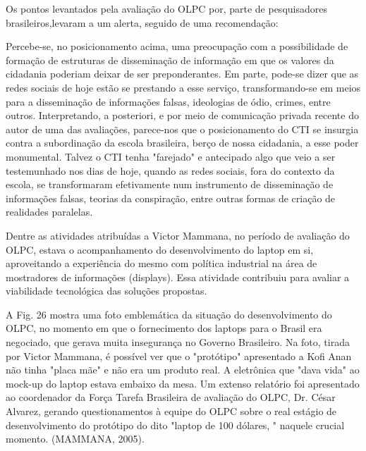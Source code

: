 Os pontos levantados pela avaliação do OLPC por, parte de pesquisadores brasileiros,levaram a um alerta, seguido de uma recomendação:


\noindent\begin{center}\mbox{\centering{}}\end{center}


Percebe-se, no posicionamento acima, uma preocupação com a possibilidade de formação de estruturas de disseminação de informação em que os valores da cidadania poderiam deixar de ser preponderantes. Em parte, pode-se dizer que as redes sociais de hoje estão se prestando a esse serviço, transformando-se em meios para a disseminação de informações falsas, ideologias de ódio, crimes, entre outros. Interpretando, a posteriori, e por meio de comunicação privada recente do autor de uma das avaliações, parece-nos que o posicionamento do CTI se insurgia contra a subordinação da escola brasileira, berço de nossa cidadania, a esse poder monumental. Talvez o CTI tenha "farejado" e antecipado algo que veio a ser testemunhado nos dias de hoje, quando as redes sociais, fora do contexto da escola, se transformaram efetivamente num instrumento de disseminação de informações falsas, teorias da conspiração, entre outras formas de criação de realidades paralelas.

Dentre as atividades atribuídas a Victor Mammana, no período de avaliação do OLPC, estava o acompanhamento do desenvolvimento do laptop em si, aproveitando a experiência do mesmo com política industrial na área de mostradores de informações (displays). Essa atividade contribuiu para avaliar a viabilidade tecnológica das soluções propostas.

A Fig. 26 mostra uma foto emblemática da situação do desenvolvimento do OLPC, no momento em que o fornecimento dos laptops para o Brasil era negociado, que gerava muita insegurança no Governo Brasileiro. Na foto, tirada por Victor Mammana, é possível ver que o "protótipo" apresentado a Kofi Anan não tinha "placa mãe" e não era um produto real. A eletrônica que "dava vida" ao mock-up do laptop estava embaixo da mesa. Um extenso relatório foi apresentado ao coordenador da Força Tarefa Brasileira de avaliação do OLPC, Dr. César Alvarez, gerando questionamentos à equipe do OLPC sobre o real estágio de desenvolvimento do protótipo do dito "laptop de 100 dólares, " naquele crucial momento. (MAMMANA, 2005).



